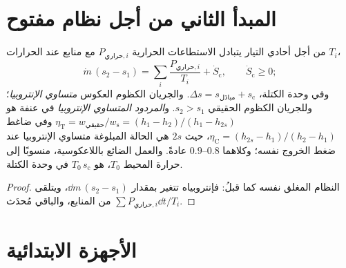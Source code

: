 \section{المبدأ الثاني من أجل نظام مفتوح}

\begin{theorem}\label{thm:b2:open-systems:secondlaw}
من أجل  أحادي التيار يتبادل الاستطاعات الحرارية
$P_{\text{حراري},i}$ مع منابع عند الحرارات $T_i$،
\[
\dot m\,(s_2 - s_1) = \sum_i\frac{P_{\text{حراري},i}}{T_i} + \dot S_{\text{c}},
\qquad \dot S_{\text{c}} \ge 0 ;
\]
وفي وحدة الكتلة، $\Delta s = s_{\text{مبادَل}} + s_{\text{c}}$. والجريان الكظوم
العكوس \emph{متساوي الإنتروبيا}؛ وللجريان الكظوم الحقيقي $s_2 >
s_1$. و\emph{المردود المتساوي الإنتروبيا} في
عنفة هو $\eta_{\text{T}} = w_{\text{حقيقي}}/w_{\text{s}} = (h_1 - h_2)/(h_1
- h_{2s})$ وفي ضاغط $\eta_{\text{C}} = (h_{2s} - h_1)/(h_2 -
h_1)$، حيث $2s$ هي الحالة المبلوغة متساوي الإنتروبيا عند ضغط
الخروج نفسه؛ وكلاهما $0.8$--$0.9$ عادةً. والعمل الضائع
باللاعكوسية، منسوبًا إلى حرارة المحيط $T_0$، هو
$T_0\,s_{\text{c}}$ في وحدة الكتلة.
\end{theorem}

\begin{proof}
النظام المغلق نفسه كما قبلُ: فإنتروبياه تتغير بمقدار $\dd m\,(s_2 -
s_1)$، ويتلقى $\sum P_{\text{حراري},i}\dd t/T_i$ من المنابع، والباقي
مُحدَث.
\end{proof}

\section{الأجهزة الابتدائية}

